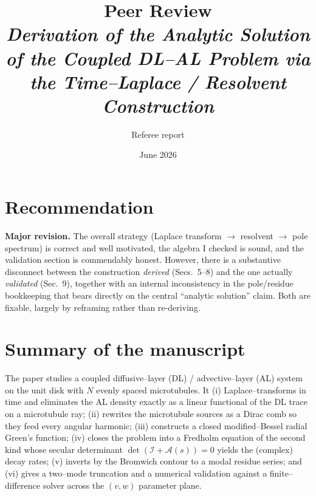 \documentclass{article}
\title{Peer Review\\[2pt]
\large\emph{Derivation of the Analytic Solution of the Coupled DL--AL Problem
via the Time--Laplace / Resolvent Construction}}
\author{Referee report}
\date{June 2026}
\begin{document}
\maketitle

\section*{Recommendation}
\textbf{Major revision.} The overall strategy (Laplace transform $\to$ resolvent
$\to$ pole spectrum) is correct and well motivated, the algebra I checked is
sound, and the validation section is commendably honest. However, there is a
substantive disconnect between the construction \emph{derived} (Secs.~5--8) and
the one actually \emph{validated} (Sec.~9), together with an internal
inconsistency in the pole/residue bookkeeping that bears directly on the central
``analytic solution'' claim. Both are fixable, largely by reframing rather than
re-deriving.

\section{Summary of the manuscript}
The paper studies a coupled diffusive--layer (DL) / advective--layer (AL) system
on the unit disk with $N$ evenly spaced microtubules. It (i) Laplace--transforms
in time and eliminates the AL density exactly as a linear functional of the DL
trace on a microtubule ray; (ii) rewrites the microtubule sources as a Dirac comb
so they feed every angular harmonic; (iii) constructs a closed modified--Bessel
radial Green's function; (iv) closes the problem into a Fredholm equation of the
second kind whose secular determinant $\det(\mathcal I + \mathcal A(s))=0$ yields
the (complex) decay rates; (v) inverts by the Bromwich contour to a modal
residue series; and (vi) gives a two--mode truncation and a numerical validation
against a finite--difference solver across the $(v,w)$ parameter plane.
\end{document}
